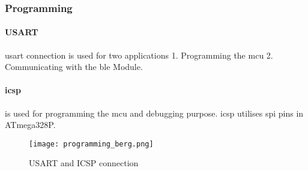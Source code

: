 
\subsubsection{Programming} \label{programming}
	\paragraph{USART}\gls{usart} connection is used for two applications 1. Programming the \gls{mcu} 2. Communicating with the \gls{ble} Module. 		
		
	\paragraph{\gls{icsp}} is used for programming the \gls{mcu} and debugging purpose. \gls{icsp} utilises \gls{spi} pins in ATmega328P.
	
	\begin{figure*}[t]
		\centering
		\caption{USART and ICSP connection}
		\label{fig:programming_berg}
		\texttt{[image: programming\_berg.png]}
	\end{figure*}	
